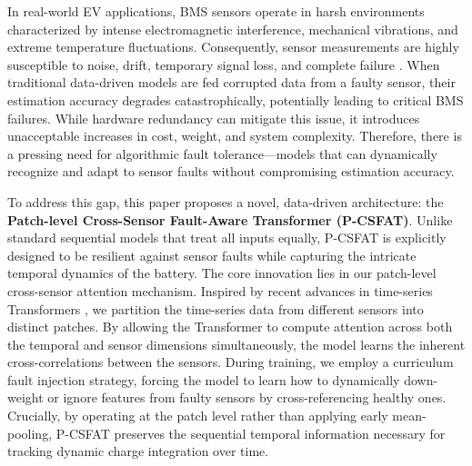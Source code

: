 \documentclass[journal]{IEEEtran}
\begin{document}
In real-world EV applications, BMS sensors operate in harsh environments characterized by intense electromagnetic interference, mechanical vibrations, and extreme temperature fluctuations. Consequently, sensor measurements are highly susceptible to noise, drift, temporary signal loss, and complete failure \cite{wang2020fault}. When traditional data-driven models are fed corrupted data from a faulty sensor, their estimation accuracy degrades catastrophically, potentially leading to critical BMS failures. While hardware redundancy can mitigate this issue, it introduces unacceptable increases in cost, weight, and system complexity. Therefore, there is a pressing need for algorithmic fault tolerance---models that can dynamically recognize and adapt to sensor faults without compromising estimation accuracy.

To address this gap, this paper proposes a novel, data-driven architecture: the \textbf{Patch-level Cross-Sensor Fault-Aware Transformer (P-CSFAT)}. Unlike standard sequential models that treat all inputs equally, P-CSFAT is explicitly designed to be resilient against sensor faults while capturing the intricate temporal dynamics of the battery. The core innovation lies in our patch-level cross-sensor attention mechanism. Inspired by recent advances in time-series Transformers \cite{nie2022time}, we partition the time-series data from different sensors into distinct patches. By allowing the Transformer to compute attention across both the temporal and sensor dimensions simultaneously, the model learns the inherent cross-correlations between the sensors. During training, we employ a curriculum fault injection strategy, forcing the model to learn how to dynamically down-weight or ignore features from faulty sensors by cross-referencing healthy ones. Crucially, by operating at the patch level rather than applying early mean-pooling, P-CSFAT preserves the sequential temporal information necessary for tracking dynamic charge integration over time.
\end{document}
